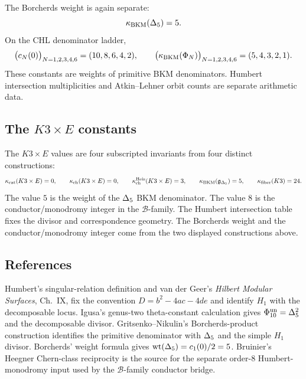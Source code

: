 The Borcherds weight is again separate:
\[
  \kappa_{\mathrm{BKM}}(\Delta_5)=5.
\]
On the CHL denominator ladder,
\[
  \bigl(c_N(0)\bigr)_{N=1,2,3,4,6}=(10,8,6,4,2),\qquad
  \bigl(\kappa_{\mathrm{BKM}}(\Phi_N)\bigr)_{N=1,2,3,4,6}=(5,4,3,2,1).
\]
These constants are weights of primitive BKM denominators.  Humbert
intersection multiplicities and Atkin--Lehner orbit counts are separate
arithmetic data.

\subsection*{The $K3\times E$ constants}
The $K3\times E$ values are four subscripted invariants from four
distinct constructions:
\[
  \kappa_{\mathrm{cat}}(K3\times E)=0,\qquad
  \kappa_{\mathrm{ch}}(K3\times E)=0,\qquad
  \kappa_{\mathrm{ch}}^{\mathrm{Heis}}(K3\times E)=3,\qquad
  \kappa_{\mathrm{BKM}}(\mathfrak g_{\Delta_5})=5,\qquad
  \kappa_{\mathrm{fiber}}(K3)=24 .
\]
The value $5$ is the weight of the $\Delta_5$ BKM denominator.  The value
$8$ is the conductor/monodromy integer in the $\mathcal B$-family.
The Humbert intersection table fixes the divisor and correspondence
geometry.  The Borcherds weight and the conductor/monodromy integer
come from the two displayed constructions above.

\subsection*{References}
Humbert's singular-relation definition and van der Geer's
\emph{Hilbert Modular Surfaces}, Ch.~IX, fix the convention
$D=b^2-4ac-4de$ and identify $H_1$ with the decomposable locus.
Igusa's genus-two theta-constant calculation gives
$\Phi_{10}^{\mathrm{un}}=\Delta_5^2$ and the decomposable divisor.
Gritsenko--Nikulin's Borcherds-product construction identifies the
primitive denominator with $\Delta_5$ and the simple $H_1$ divisor.
Borcherds' weight formula gives $\mathrm{wt}(\Delta_5)=c_1(0)/2=5$.
Bruinier's Heegner Chern-class reciprocity is the source for the
separate order-$8$ Humbert-monodromy input used by the
$\mathcal B$-family conductor bridge.
